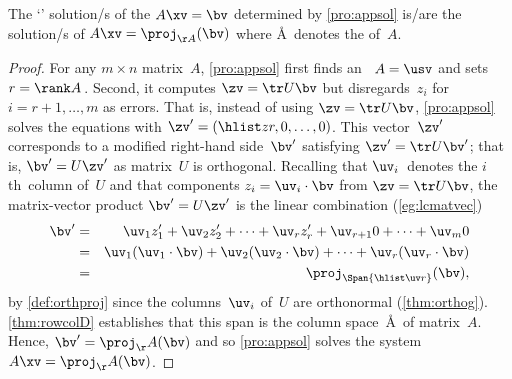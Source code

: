 \begin{theorem}[] \label{thm:lsqproj}
The `' solution/s of the  \(A\xv=\bv\) determined by \cref{pro:appsol} is/are the solution/s of \(A\xv=\proj_{\AA}(\bv)\) where \AA~denotes the  of~\(A\).
\end{theorem}

\begin{proof} 
For any \(m\times n\) matrix~\(A\), \cref{pro:appsol} first finds an \svd\ \(A=\usv\) and sets \(r=\rank A\)\,.
Second, it computes \(\zv=\tr U\bv\) but disregards~\(z_i\) for \(i=r+1,\ldots,m\) as errors.
That is, instead of using \(\zv=\tr U\bv\), \cref{pro:appsol} solves the equations with \(\zv'=(\hlist zr,0,\ldots,0)\). 
This vector~\(\zv'\) corresponds to a modified right-hand side~\(\bv'\) satisfying \(\zv'=\tr U\bv'\); that is, \(\bv'=U\zv'\) as matrix~\(U\) is orthogonal.
Recalling that \(\uv_i\)~denotes the \(i\)th~column of~\(U\) and that components \(z_i=\uv_i\cdot\bv\) from  \(\zv=\tr U\bv\),
the matrix-vector product \(\bv'=U\zv'\) is the linear combination (\cref{eg:lcmatvec})
\begin{eqnarray*}
\bv'&=&\uv_1z'_1+\uv_2z'_2+\cdots+\uv_rz'_r+\uv_{r+1}0+\cdots+\uv_m0
\\&=&\uv_1(\uv_1\cdot\bv)+\uv_2(\uv_2\cdot\bv)+\cdots+\uv_r(\uv_r\cdot\bv)
\\&=&\proj_{\Span\{\hlist\uv r\}}(\bv),
\end{eqnarray*}
by \cref{def:orthproj} since the columns~\(\uv_i\) of~\(U\) are orthonormal (\cref{thm:orthog}).
\cref{thm:rowcolD} establishes that this span is the column space~\AA\ of matrix~\(A\).
Hence, \(\bv'=\proj_\AA(\bv)\) and so \cref{pro:appsol} solves the system \(A\xv=\proj_\AA(\bv)\).
\end{proof}


